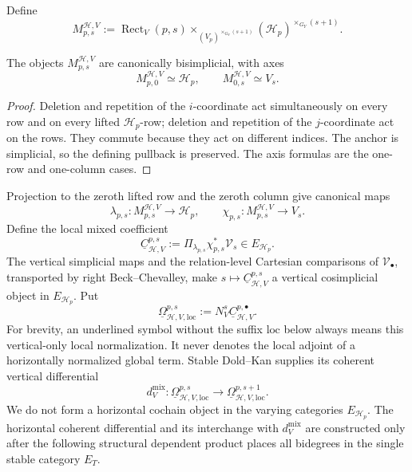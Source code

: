 \begin{definition}
\label{def:prequantum-mixed-symmetry-vertical-relation}
Define
\[
\boxed{
M^{\mathcal H,V}_{p,s}
:=
\operatorname{Rect}_V(p,s)
\times_{(V_p)^{\times_{G_Y}(s+1)}}
(\mathcal H_p)^{\times_{G_Y}(s+1)}.
}
\]
\end{definition}

\begin{proposition}
\label{prop:prequantum-bisimplicial-mixed-geometry}
The objects $M^{\mathcal H,V}_{p,s}$ are canonically bisimplicial, with axes
\[
M^{\mathcal H,V}_{p,0}\simeq\mathcal H_p,
\qquad
M^{\mathcal H,V}_{0,s}\simeq V_s.
\]
\end{proposition}

\begin{proof}
Deletion and repetition of the $i$-coordinate act simultaneously on every row and
on every lifted $\mathcal H_p$-row; deletion and repetition of the $j$-coordinate
act on the rows.  They commute because they act on different indices.  The anchor
is simplicial, so the defining pullback is preserved.  The axis formulas are the
one-row and one-column cases.
\end{proof}

Projection to the zeroth lifted row and the zeroth column give canonical maps
\[
\lambda_{p,s}:M^{\mathcal H,V}_{p,s}\longrightarrow\mathcal H_p,
\qquad
\chi_{p,s}:M^{\mathcal H,V}_{p,s}\longrightarrow V_s.
\]
Define the local mixed coefficient
\[
\boxed{
\underline C^{p,s}_{\mathcal H,V}
:=
\Pi_{\lambda_{p,s}}\chi_{p,s}^*\mathcal V_s
\in E_{\mathcal H_p}.
}
\]
The vertical simplicial maps and the relation-level Cartesian comparisons of
$\mathcal V_\bullet$, transported by right Beck--Chevalley, make
$s\mapsto\underline C^{p,s}_{\mathcal H,V}$ a vertical cosimplicial object in
$E_{\mathcal H_p}$.  Put
\[
\underline\Omega^{p,s}_{\mathcal H,V,\mathrm{loc}}
:=N_V^s\underline C^{p,\bullet}_{\mathcal H,V}.
\]
For brevity, an underlined symbol without the suffix $\mathrm{loc}$ below always
means this vertical-only local normalization.  It never denotes the local
adjoint of a horizontally normalized global term.
Stable Dold--Kan supplies its coherent vertical differential
\[
d_V^{\mathrm{mix}}:
\underline\Omega^{p,s}_{\mathcal H,V,\mathrm{loc}}
\longrightarrow
\underline\Omega^{p,s+1}_{\mathcal H,V,\mathrm{loc}}.
\]
We do not form a horizontal cochain object in the varying categories
$E_{\mathcal H_p}$.  The horizontal coherent differential and its interchange
with $d_V^{\mathrm{mix}}$ are constructed only after the following structural
dependent product places all bidegrees in the single stable category $E_T$.


